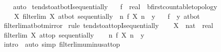 \begin{isabellebody}
\ \ \isamarkupfalse%
\ auto%
\endisatagproof
{\isafoldproof}%
%
\isadelimproof
\isanewline
%
\endisadelimproof
\isanewline
{}\isamarkupfalse%
\ tendsto{\isacharunderscore}{\kern0pt}at{\isacharunderscore}{\kern0pt}botI{\isacharunderscore}{\kern0pt}sequentially{\isacharcolon}{\kern0pt}\isanewline
\ \ \ f\ {\isacharcolon}{\kern0pt}{\isacharcolon}{\kern0pt}\ {\isachardoublequoteopen}real\ {\isasymRightarrow}\ {\isacharprime}{\kern0pt}b{\isacharcolon}{\kern0pt}{\isacharcolon}{\kern0pt}first{\isacharunderscore}{\kern0pt}countable{\isacharunderscore}{\kern0pt}topology{\isachardoublequoteclose}\isanewline
\ \ \ {\isacharasterisk}{\kern0pt}{\isacharcolon}{\kern0pt}\ {\isachardoublequoteopen}{\isasymAnd}X{\isachardot}{\kern0pt}\ filterlim\ X\ at{\isacharunderscore}{\kern0pt}bot\ sequentially\ {\isasymLongrightarrow}\ {\isacharparenleft}{\kern0pt}{\isasymlambda}n{\isachardot}{\kern0pt}\ f\ {\isacharparenleft}{\kern0pt}X\ n{\isacharparenright}{\kern0pt}{\isacharparenright}{\kern0pt}\ {\isasymlonglonglongrightarrow}\ y{\isachardoublequoteclose}\isanewline
\ \ \ {\isachardoublequoteopen}{\isacharparenleft}{\kern0pt}f\ {\isasymlonglongrightarrow}\ y{\isacharparenright}{\kern0pt}\ at{\isacharunderscore}{\kern0pt}bot{\isachardoublequoteclose}\isanewline
%
\isadelimproof
\ \ %
\endisadelimproof
%
\isatagproof
{}\isamarkupfalse%
\ filterlim{\isacharunderscore}{\kern0pt}at{\isacharunderscore}{\kern0pt}bot{\isacharunderscore}{\kern0pt}mirror\isanewline
{}\isamarkupfalse%
\ {\isacharparenleft}{\kern0pt}rule\ tendsto{\isacharunderscore}{\kern0pt}at{\isacharunderscore}{\kern0pt}topI{\isacharunderscore}{\kern0pt}sequentially{\isacharparenright}{\kern0pt}\isanewline
\ \ \isamarkupfalse%
\ X\ {\isacharcolon}{\kern0pt}{\isacharcolon}{\kern0pt}\ {\isachardoublequoteopen}nat\ {\isasymRightarrow}\ real{\isachardoublequoteclose}\ \isamarkupfalse%
\ {\isachardoublequoteopen}filterlim\ X\ at{\isacharunderscore}{\kern0pt}top\ sequentially{\isachardoublequoteclose}\isanewline
\ \ \isamarkupfalse%
\ {\isachardoublequoteopen}{\isacharparenleft}{\kern0pt}{\isasymlambda}n{\isachardot}{\kern0pt}\ f\ {\isacharparenleft}{\kern0pt}{\isacharminus}{\kern0pt}X\ n{\isacharparenright}{\kern0pt}{\isacharparenright}{\kern0pt}\ {\isasymlonglonglongrightarrow}\ y{\isachardoublequoteclose}\ \isamarkupfalse%
\ {\isacharparenleft}{\kern0pt}intro\ {\isacharasterisk}{\kern0pt}{\isacharparenright}{\kern0pt}\ {\isacharparenleft}{\kern0pt}auto\ simp{\isacharcolon}{\kern0pt}\ filterlim{\isacharunderscore}{\kern0pt}uminus{\isacharunderscore}{\kern0pt}at{\isacharunderscore}{\kern0pt}top{\isacharparenright}{\kern0pt}\isanewline

\end{isabellebody}
